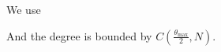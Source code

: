 \documentclass[11pt,reqno,a4paper]{amsart}
\begin{document}
    We use \cite{Bernot}


        And the degree is bounded by $C \left( \frac{\theta_{\max}}{2},N\right)$.
    \nocite{*}
    \printbibliography
\end{document}
